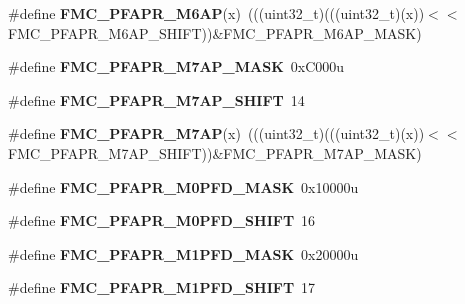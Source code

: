 \begin{DoxyCompactItemize}
\item 
\#define {\bfseries F\+M\+C\+\_\+\+P\+F\+A\+P\+R\+\_\+\+M6\+AP}(x)~(((uint32\+\_\+t)(((uint32\+\_\+t)(x))$<$$<$F\+M\+C\+\_\+\+P\+F\+A\+P\+R\+\_\+\+M6\+A\+P\+\_\+\+S\+H\+I\+FT))\&F\+M\+C\+\_\+\+P\+F\+A\+P\+R\+\_\+\+M6\+A\+P\+\_\+\+M\+A\+SK)\hypertarget{group__FMC__Register__Masks_ga3b0984be7cff1cbfc30c8c9fe2402b9b}{}\label{group__FMC__Register__Masks_ga3b0984be7cff1cbfc30c8c9fe2402b9b}

\item 
\#define {\bfseries F\+M\+C\+\_\+\+P\+F\+A\+P\+R\+\_\+\+M7\+A\+P\+\_\+\+M\+A\+SK}~0x\+C000u\hypertarget{group__FMC__Register__Masks_ga87c7451b98f752717c6122892b4fc9a9}{}\label{group__FMC__Register__Masks_ga87c7451b98f752717c6122892b4fc9a9}

\item 
\#define {\bfseries F\+M\+C\+\_\+\+P\+F\+A\+P\+R\+\_\+\+M7\+A\+P\+\_\+\+S\+H\+I\+FT}~14\hypertarget{group__FMC__Register__Masks_ga8117d628a5889cb4983db0cc892e669c}{}\label{group__FMC__Register__Masks_ga8117d628a5889cb4983db0cc892e669c}

\item 
\#define {\bfseries F\+M\+C\+\_\+\+P\+F\+A\+P\+R\+\_\+\+M7\+AP}(x)~(((uint32\+\_\+t)(((uint32\+\_\+t)(x))$<$$<$F\+M\+C\+\_\+\+P\+F\+A\+P\+R\+\_\+\+M7\+A\+P\+\_\+\+S\+H\+I\+FT))\&F\+M\+C\+\_\+\+P\+F\+A\+P\+R\+\_\+\+M7\+A\+P\+\_\+\+M\+A\+SK)\hypertarget{group__FMC__Register__Masks_ga9b319489763e3896418dc291ca062b1e}{}\label{group__FMC__Register__Masks_ga9b319489763e3896418dc291ca062b1e}

\item 
\#define {\bfseries F\+M\+C\+\_\+\+P\+F\+A\+P\+R\+\_\+\+M0\+P\+F\+D\+\_\+\+M\+A\+SK}~0x10000u\hypertarget{group__FMC__Register__Masks_ga5f6efa8c02f2a2f04d5b62f8de35e9a9}{}\label{group__FMC__Register__Masks_ga5f6efa8c02f2a2f04d5b62f8de35e9a9}

\item 
\#define {\bfseries F\+M\+C\+\_\+\+P\+F\+A\+P\+R\+\_\+\+M0\+P\+F\+D\+\_\+\+S\+H\+I\+FT}~16\hypertarget{group__FMC__Register__Masks_ga5d7609bb54910d8b7be4dc3b868c040c}{}\label{group__FMC__Register__Masks_ga5d7609bb54910d8b7be4dc3b868c040c}

\item 
\#define {\bfseries F\+M\+C\+\_\+\+P\+F\+A\+P\+R\+\_\+\+M1\+P\+F\+D\+\_\+\+M\+A\+SK}~0x20000u\hypertarget{group__FMC__Register__Masks_ga3288aee0551874c34ce18211489a5f74}{}\label{group__FMC__Register__Masks_ga3288aee0551874c34ce18211489a5f74}

\item 
\#define {\bfseries F\+M\+C\+\_\+\+P\+F\+A\+P\+R\+\_\+\+M1\+P\+F\+D\+\_\+\+S\+H\+I\+FT}~17\hypertarget{group__FMC__Register__Masks_gaf51c3aa2255cc9c8efe5c2a705593f8f}{}\label{group__FMC__Register__Masks_gaf51c3aa2255cc9c8efe5c2a705593f8f}


\end{DoxyCompactItemize}
